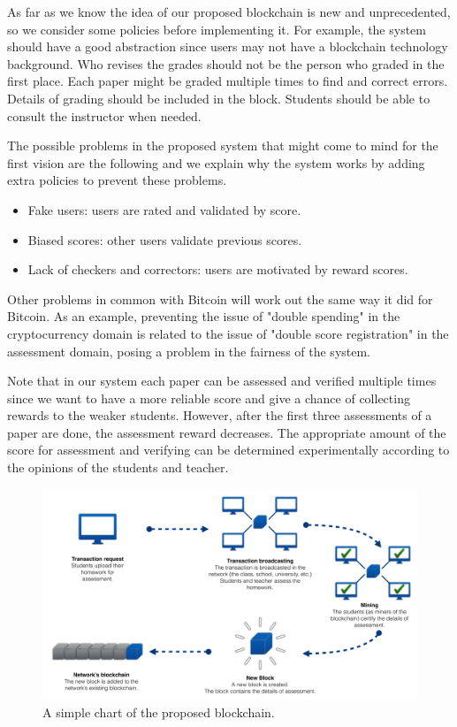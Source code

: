 \documentclass[manuscript,review,anonymous]{acmart}%
\begin{document}
As far as we know the idea of our proposed blockchain is new and unprecedented, so we consider some policies before implementing it. For example, the system should have a good abstraction since users may not have a blockchain technology background. Who revises the grades should not be the person who graded in the first place. Each paper might be graded multiple times to find and correct errors. Details of grading should be included in the block. Students should be able to consult the instructor when needed.


The possible problems in the proposed system that might come to mind for the first vision are the following and we explain why the system works by adding 
extra policies to prevent these problems.
\begin{itemize}
\item Fake users: users are rated and validated by score.
\item Biased scores: other users validate previous scores. 
\item Lack of checkers and correctors: users are motivated by reward scores.
\end{itemize}

Other problems in common with Bitcoin will work out the same way it did for Bitcoin. As an example, preventing the issue of "double spending" in the cryptocurrency domain is related to the issue of "double score registration" in the assessment domain, posing a problem in the fairness of the system.

Note that in our system each paper can be assessed and verified multiple times since we want to have a more reliable score and give a chance of collecting rewards to the weaker students. However, after the first three assessments of a paper are done, the assessment reward decreases.
The appropriate amount of the score for assessment and verifying can be determined experimentally according to the opinions of the students and teacher. 


\begin{figure}[H]
 \caption{A simple chart of the proposed blockchain.}

\includegraphics[scale=0.15]{fig1.pdf}


\label{fig1}
\end{figure}
\end{document}
